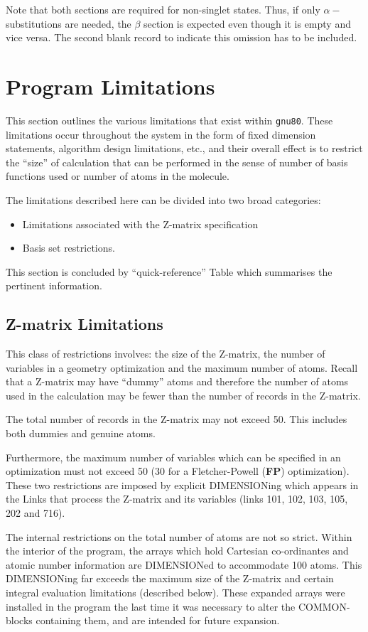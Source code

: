 Note that both sections are required for non-singlet states. Thus,
if only $\alpha-$ substitutions are needed, the $\beta$ section is expected
even though it is empty and vice versa. The second blank record to
indicate this omission has to be included.
\section{\sf Program Limitations}
\label{limit}
This section outlines the various limitations
that exist within {\tt gnu80}.  These limitations occur throughout the
system in the form of fixed dimension statements, algorithm design
limitations, etc., and their overall effect is 
to restrict the ``size'' of
calculation that can be performed in the sense of number of
basis functions used or number of atoms in the molecule.

The limitations described here can be divided into two broad categories:
\begin{itemize}
\item Limitations associated with the Z-matrix specification 
\item Basis
set restrictions.  
\end{itemize}
This section is concluded by
``quick-reference''  Table which summarises the
pertinent information.
\subsection{\sf Z-matrix Limitations}
This class of restrictions involves: the size of the Z-matrix, the number
of variables in a geometry optimization and the maximum number of atoms.
Recall that a Z-matrix may have ``dummy'' atoms and 
therefore the number of
atoms used in the calculation may be fewer than the number of records in the
Z-matrix.  

The total number of records in the Z-matrix may not exceed 50.
This includes both dummies and genuine atoms.  

Furthermore, the maximum
number of variables which can be specified in an optimization must not exceed
50 (30 for a Fletcher-Powell ({\bf FP}) optimization).  
These two restrictions are imposed
by explicit DIMENSIONing which appears in the Links that process the Z-matrix
and its variables (links 101, 102, 103, 105, 202 and 716).

The internal restrictions on the total number of atoms are not so strict.
Within the interior of the program, the arrays which hold
Cartesian co-ordinantes and atomic number information are DIMENSIONed to
accommodate 100 atoms.  This DIMENSIONing far exceeds the maximum size
of the Z-matrix and certain integral evaluation limitations (described below).
These expanded arrays were installed in the program the last time it was
necessary to alter the COMMON-blocks containing them, and are intended for
future expansion.
